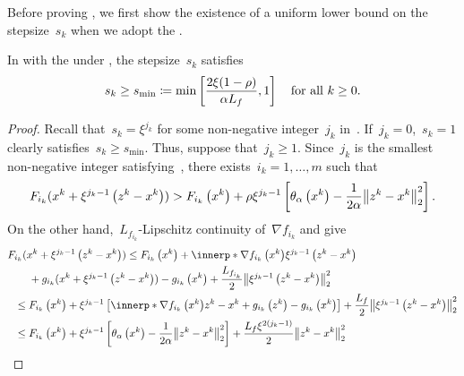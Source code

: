 \documentclass[../../main]{subfiles}
\begin{document}
Before proving , we first show the existence of a uniform lower bound on the stepsize~$s_k$ when we adopt the .
\begin{lemma} 
    In  with the  under , the stepsize~$s_k$ satisfies
    \begin{equation}
        s_k \ge s_{\min} \coloneqq \min \left[\frac{2 \xi (1 - \rho)}{\alpha L_f}, 1\right] \quad \text{for all~$k \ge 0$}
        .\end{equation}
\end{lemma}
\begin{proof}
    Recall that~$s_k = \xi^{j_k}$ for some non-negative integer~$j_k$ in~.
    If~$j_k = 0$,~$s_k = 1$ clearly satisfies~$s_k \ge s_{\min}$.
    Thus, suppose that~$j_k \ge 1$.
    Since~$j_k$ is the smallest non-negative integer satisfying~, there exists~$i_k = 1, \dots, m$ such that
    \begin{equation}
        F_{i_k}(x^k + \xi^{j_k - 1} \left(z^k - x^k\right)) > F_{i_k}\left(x^k\right) + \rho \xi^{j_k - 1} \left[ \theta_\alpha\left(x^k\right) - \frac{1}{2\alpha} \norm*{z^k - x^k}_2^2 \right]
        .\end{equation}
    On the other hand,~$L_{f_{i_k}}$-Lipschitz continuity of~$\nabla f_{i_k}$ and  give
    \begin{align}
        \MoveEqLeft F_{i_k}(x^k + \xi^{j_k - 1} \left(z^k - x^k\right)) \le F_{i_k}\left(x^k\right) + \innerp*{\nabla f_{i_k}\left(x^k\right)}{\xi^{j_k - 1} \left(z^k - x^k\right)}                                                            \\
              & + g_{i_k}(x^k + \xi^{j_k - 1} \left(z^k - x^k\right)) - g_{i_k}\left(x^k\right) + \frac{L_{f_{i_k}}}{2} \norm*{\xi^{j_k - 1} \left(z^k - x^k\right)}_2^2                                                                        \\
        \le{} & F_{i_k}\left(x^k\right) + \xi^{j_k - 1} \left[ \innerp*{\nabla f_{i_k}\left(x^k\right)}{z^k - x^k} + g_{i_k}\left(z^k\right) - g_{i_k}\left(x^k\right) \right] + \frac{L_f}{2} \norm*{\xi^{j_k - 1} \left(z^k - x^k\right)}_2^2 \\
        \le{} & F_{i_k}\left(x^k\right) + \xi^{j_k - 1} \left[ \theta_\alpha\left(x^k\right) - \frac{1}{2 \alpha} \norm*{z^k - x^k}_2^2 \right] + \frac{L_f \xi^{2 (j_k - 1)}}{2} \norm*{z^k - x^k}_2^2

\end{align}
\end{proof}
\end{document}
